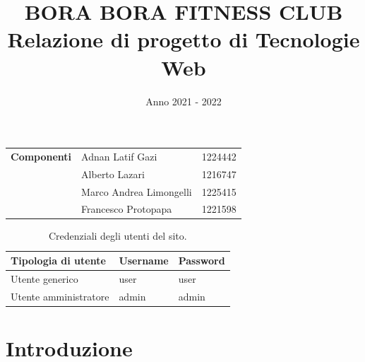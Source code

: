 \documentclass[a4paper]{article}
\title{
	\textbf{BORA BORA FITNESS CLUB}\\
	\large Relazione di progetto di Tecnologie Web
}
\date{Anno 2021 - 2022}
\begin{document}
	\maketitle

	\begin{center}
		\begin{tabular}{c|l l}
			\textbf{Componenti}	& Adnan Latif Gazi			& 1224442\\
								& Alberto Lazari			& 1216747\\
								& Marco Andrea Limongelli	& 1225415\\
								& Francesco Protopapa		& 1221598\\
		\end{tabular}
	\end{center}

	\begin{table}[H]
		\centering
		\begin{tabular}{|l|l|l|}
			\hline
			\textbf{Tipologia di utente}	& \textbf{Username}	& \textbf{Password}\\
			\hline
			Utente generico					& user				& user\\
			\hline
			Utente amministratore			& admin				& admin\\
			\hline
		\end{tabular}
		\caption{Credenziali degli utenti del sito.}
	\end{table}

	\pagebreak

	\renewcommand{\contentsname}{Indice}
	\tableofcontents
	\pagebreak

	\section{Introduzione}
\end{document}
